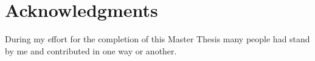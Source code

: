 \documentclass[../main/thesis_msc.tex]{subfiles}
\begin{document}
\chapter*{Acknowledgments}

During my effort for the completion of this Master Thesis many people had stand by me and contributed in one way or another.
\end{document}
